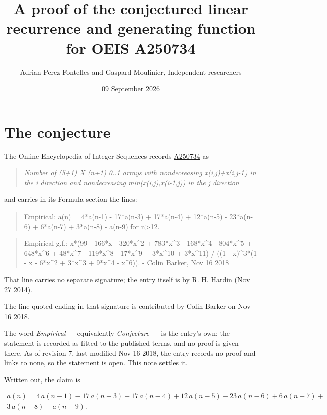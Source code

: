 \documentclass[11pt]{article}
\title{A proof of the conjectured linear recurrence and generating function for OEIS A250734}
\author{Adrian Perez Fontelles and Gaspard Moulinier, Independent researchers}
\date{09 September 2026}
\theoremstyle{definition}
\begin{document}
\maketitle
\section{The conjecture}

The Online Encyclopedia of Integer Sequences records \href{https://oeis.org/A250734}{A250734} as

\begin{quote}\itshape Number of (5+1) X (n+1) 0..1 arrays with nondecreasing x(i,j)+x(i,j-1) in the i direction and nondecreasing min(x(i,j),x(i-1,j)) in the j direction\end{quote}

and carries in its Formula section the lines:

\begin{quote}\ttfamily Empirical: a(n) = 4*a(n-1) - 17*a(n-3) + 17*a(n-4) + 12*a(n-5) - 23*a(n-6) + 6*a(n-7) + 3*a(n-8) - a(n-9) for n>12.\end{quote}

\begin{quote}\ttfamily Empirical g.f.: x*(99 - 166*x - 320*x\textasciicircum{}2 + 783*x\textasciicircum{}3 - 168*x\textasciicircum{}4 - 804*x\textasciicircum{}5 + 648*x\textasciicircum{}6 + 48*x\textasciicircum{}7 - 119*x\textasciicircum{}8 - 17*x\textasciicircum{}9 + 3*x\textasciicircum{}10 + 3*x\textasciicircum{}11) / ((1 - x)\textasciicircum{}3*(1 - x - 6*x\textasciicircum{}2 + 3*x\textasciicircum{}3 + 9*x\textasciicircum{}4 - x\textasciicircum{}6)). - Colin Barker, Nov 16 2018\end{quote}

That line carries no separate signature; the entry itself is by R. H. Hardin (Nov 27 2014).

The line quoted ending in that signature is contributed by Colin Barker on Nov 16 2018.

The word {\itshape Empirical} --- equivalently {\itshape Conjecture} --- is the entry's own: the statement is recorded as fitted to the published terms, and no proof is given there. As of revision 7, last modified Nov 16 2018, the entry records no proof and links to none, so the statement is open. This note settles it.

Written out, the claim is

\begin{multline*} a(n) = 4\,a(n-1) - 17\,a(n-3) + 17\,a(n-4) + 12\,a(n-5) - 23\,a(n-6) + 6\,a(n-7) + \\ 3\,a(n-8) - a(n-9). \end{multline*}
\end{document}
